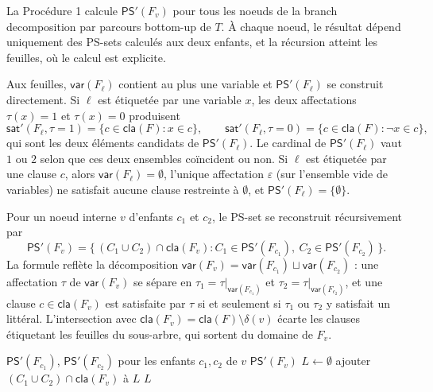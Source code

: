 \documentclass[11pt,a4paper]{report}
\theoremstyle{plain}
\theoremstyle{definition}
\begin{document}
La Procédure 1 calcule $\mathsf{PS}'(F_v)$ pour tous les noeuds de la
branch decomposition par parcours bottom-up de $T$. À chaque noeud, le
résultat dépend uniquement des PS-sets calculés aux deux enfants, et
la récursion atteint les feuilles, où le calcul est explicite.

Aux feuilles, $\mathsf{var}(F_\ell)$ contient au plus une variable et
$\mathsf{PS}'(F_\ell)$ se construit directement. Si $\ell$ est étiquetée
par une variable $x$, les deux affectations $\tau(x) = 1$ et
$\tau(x) = 0$ produisent
\[
  \mathsf{sat}'(F_\ell, \tau{=}1) = \{c \in \mathsf{cla}(F) : x \in c\},
  \qquad
  \mathsf{sat}'(F_\ell, \tau{=}0) = \{c \in \mathsf{cla}(F) : \neg x \in c\},
\]
qui sont les deux éléments candidats de $\mathsf{PS}'(F_\ell)$. Le
cardinal de $\mathsf{PS}'(F_\ell)$ vaut $1$ ou $2$ selon que ces deux
ensembles coïncident ou non. Si $\ell$ est étiquetée par une clause
$c$, alors $\mathsf{var}(F_\ell) = \emptyset$, l'unique affectation
$\varepsilon$ (sur l'ensemble vide de variables) ne satisfait aucune
clause restreinte à $\emptyset$, et $\mathsf{PS}'(F_\ell) =
\{\emptyset\}$.

Pour un noeud interne $v$ d'enfants $c_1$ et $c_2$, le PS-set se
reconstruit récursivement par
\[
  \mathsf{PS}'(F_v) = \bigl\{\,(C_1 \cup C_2) \cap \mathsf{cla}(F_v) :
  C_1 \in \mathsf{PS}'(F_{c_1}),\ C_2 \in \mathsf{PS}'(F_{c_2})\,\bigr\}.
\]
La formule reflète la décomposition $\mathsf{var}(F_v) =
\mathsf{var}(F_{c_1}) \sqcup \mathsf{var}(F_{c_2})$ : une affectation
$\tau$ de $\mathsf{var}(F_v)$ se sépare en $\tau_1 =
\tau|_{\mathsf{var}(F_{c_1})}$ et $\tau_2 = \tau|_{\mathsf{var}(F_{c_2})}$,
et une clause $c \in \mathsf{cla}(F_v)$ est satisfaite par $\tau$ si et
seulement si $\tau_1$ ou $\tau_2$ y satisfait un littéral. L'intersection
avec $\mathsf{cla}(F_v) = \mathsf{cla}(F) \setminus \delta(v)$ écarte les
clauses étiquetant les feuilles du sous-arbre, qui sortent du domaine
de $F_v$.

\begin{algorithm}[H]
\caption{Génération de $\mathsf{PS}'(F_v)$}
\label{algo:proc1}
\begin{algorithmic}[1]
\Require $\mathsf{PS}'(F_{c_1})$, $\mathsf{PS}'(F_{c_2})$ pour les enfants $c_1, c_2$ de $v$
\Ensure $\mathsf{PS}'(F_v)$
\State $L \leftarrow \emptyset$
  \State ajouter $(C_1 \cup C_2) \cap \mathsf{cla}(F_v)$ à $L$
\EndFor
\State \Return $L$
\end{algorithmic}
\end{algorithm}
\end{document}
